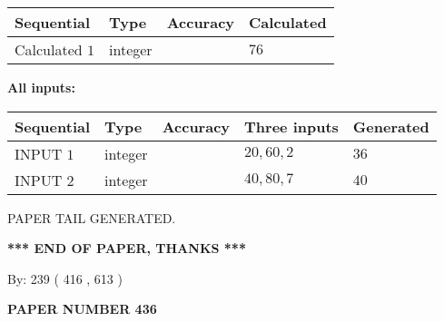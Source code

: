 \documentclass[12pt]{article}
\begin{document}
   
  
  
\noindent\begin{tabular}{|l|l|l|l|}
\hline
 Sequential & Type & Accuracy & Calculated \\ 
\hline
 
 
  Calculated $  1 $ & integer &  & 
  $ 76 $ 
 \\  \hline  
 \end{tabular}
   
   
   
   
\noindent\vspace{0.1in}\hspace{-0.08in} {\textbf{\Large{All inputs: }}}
   
   
  
  
\noindent\begin{tabular}{|l|l|l|l|l|}
\hline
 Sequential & Type & Accuracy & Three inputs & Generated \\ 
\hline
 
 
  INPUT $  1 $ & integer &  & $
 20
 , 
 60
 , 
 2
 $ & $ 36 $ 
 \\  \hline  
 
 
  INPUT $  2 $ & integer &  & $
 40
 , 
 80
 , 
 7
 $ & $ 40 $ 
 \\  \hline  
 \end{tabular}
   
   
   
   
   
   
 \vspace{0.2in}
 
   
   
\vspace{2.0in} PAPER TAIL GENERATED.
   
   
   
   
\vspace{1.0in} 
{\textbf{\large{ *** END OF PAPER, THANKS *** }}} 
   
   
\hspace{1.0in} By: 
 239 ( 416 ,  613 )
   
   
   
   
\newpage 
\setcounter{page}{ 
   436001 } 
   
   
   
   
 {\textbf{ \Large{ PAPER NUMBER  436  }}}
   
   
\vspace{0.2in}
   
   
   
\end{document}
